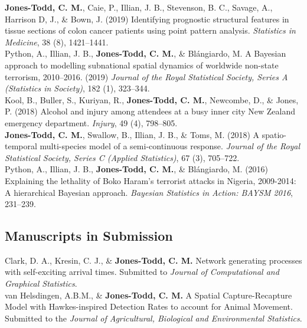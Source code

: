 \documentclass[10pt,a4paper]{moderncv}
\begin{document}
\vspace{-3pt}
 \textbf{Jones-Todd, C. M.}, Caie, P., Illian, J. B., Stevenson, B. C., Savage, A., Harrison D, J., \& Bown, J. (2019) Identifying prognostic structural features in tissue sections of colon cancer patients using point pattern analysis. \textit{Statistics in Medicine}, 38 (8), 1421--1441.\\

\vspace{-3pt}
 Python, A.,  Illian, J. B., \textbf{Jones-Todd, C. M.}, \& Bl\'{a}ngiardo, M. A Bayesian approach to modelling subnational spatial dynamics of worldwide non-state terrorism, 2010--2016. (2019) \textit{Journal of the Royal Statistical Society, Series  A (Statistics in Society)}, 182 (1), 323--344.\\

\vspace{-3pt}
Kool, B., Buller, S., Kuriyan, R., \textbf{Jones-Todd, C. M.}, Newcombe, D., \& Jones, P. (2018) Alcohol and injury among attendees at a busy inner city New Zealand emergency department. \textit{Injury}, 49 (4), 798--805.\\


 \textbf{Jones-Todd, C. M.}, Swallow, B., Illian, J. B., \& Toms, M. (2018) A spatio-temporal multi-species model of a semi-continuous response. \textit{Journal of the Royal Statistical Society, Series C (Applied Statistics)}, 67 (3), 705--722.\\

\vspace{-3pt}
Python, A.,  Illian, J. B., \textbf{Jones-Todd, C. M.}, \& Bl\'{a}ngiardo, M. (2016) Explaining the lethality of Boko Haram’s terrorist attacks in Nigeria, 2009-2014: A hierarchical Bayesian approach. \textit{Bayesian Statistics in Action: BAYSM 2016}, 231--239.\\

\newpage

\subsection{Manuscripts in Submission}

Clark, D. A., Kresin, C. J., \&  \textbf{Jones-Todd, C. M.} Network generating processes with self-exciting arrival times. Submitted to \textit{Journal of Computational and Graphical Statistics}.\\

 van Helsdingen, A.B.M., \& \textbf{Jones-Todd, C. M.} A Spatial Capture-Recapture Model with Hawkes-inspired Detection Rates to account for Animal Movement. Submitted to the \textit{Journal of Agricultural, Biological and Environmental Statistics}.\\
\end{document}
